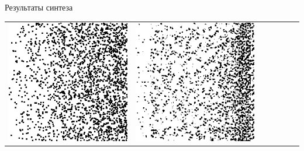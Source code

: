 \documentclass[12pt]{beamer}
\begin{document}
\begin{frame}{Результаты синтеза}
\begin{table}
\begin{center}
\begin{tabular}{p{1.2cm} p{1.2cm} p{1.2cm} p{1.2cm} p{1.2cm} p{1.2cm} p{1.2cm}}
					\includegraphics[width=1\linewidth]{8-results/sand-trend8/pan3}
					&
					\includegraphics[width=1\linewidth]{8-results/sand-trend8/nf32e5/gen3}
					&

\end{tabular}
\end{center}
\end{table}
\end{frame}
\end{document}
